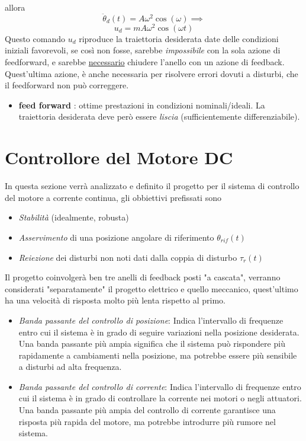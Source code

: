 \documentclass[10pt, letterpaper]{report}
\begin{document}
allora 
$$\ddot\theta_d(t)=A\omega^2\cos(\omega)\implies $$
$$ 
u_d=mA\omega^2\cos(\omega t)
$$
Questo comando $u_d$ riproduce la traiettoria desiderata date delle condizioni iniziali favorevoli, se così non fosse, sarebbe \textit{impossibile} con la sola azione di feedforward, e sarebbe \underline{necessario} chiudere l'anello con un azione di feedback. Quest'ultima azione, è anche necessaria per risolvere errori dovuti a disturbi, che il feedforward non può correggere.
\begin{itemize}
    \item \textbf{feed forward} : ottime prestazioni in condizioni nominali/ideali. La traiettoria desiderata deve però essere \textit{liscia} (sufficientemente differenziabile).
\end{itemize}
\flowerLine 
\section{Controllore del Motore DC}
In questa sezione verrà analizzato e definito il progetto per il sistema di controllo del motore a corrente continua, gli obbiettivi prefissati sono\begin{itemize}
    \item \textit{Stabilità} (idealmente, robusta)
    \item \textit{Asservimento} di una posizione angolare di riferimento $\theta_{rif}(t)$
    \item \textit{Reiezione} dei disturbi non noti dati dalla coppia di disturbo $\tau_r(t)$
\end{itemize}
Il progetto coinvolgerà ben tre anelli di feedback posti "a cascata", verranno considerati "separatamente" il progetto elettrico e quello meccanico, quest'ultimo ha una velocità di risposta molto più lenta rispetto al primo.
\begin{itemize}
    \item \textit{Banda passante del controllo di posizione}: Indica l'intervallo di frequenze entro cui il sistema è in grado di seguire variazioni nella posizione desiderata. Una banda passante più ampia significa che il sistema può rispondere più rapidamente a cambiamenti nella posizione, ma potrebbe essere più sensibile a disturbi ad alta frequenza.
    \item \textit{Banda passante del controllo di corrente}: Indica l'intervallo di frequenze entro cui il sistema è in grado di controllare la corrente nei motori o negli attuatori. Una banda passante più ampia del controllo di corrente garantisce una risposta più rapida del motore, ma potrebbe introdurre più rumore nel sistema.
\end{itemize}
\end{document}
